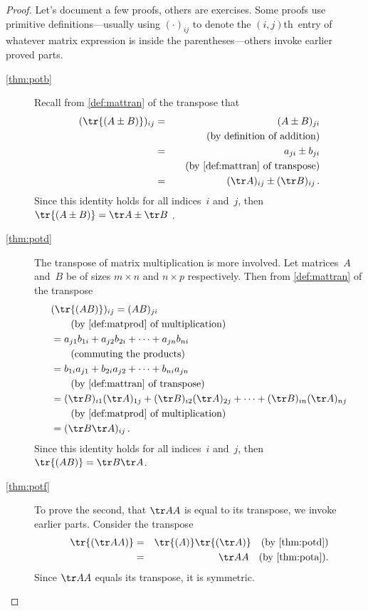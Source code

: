\begin{proof} 
Let's document a few proofs, others are exercises.
Some proofs use primitive definitions---usually using \((\cdot)_{ij}\) to denote the \((i,j)\)th~entry of whatever matrix expression is inside the parentheses---others invoke earlier proved parts.
\begin{description}
\item[\ref{thm:potb}]
Recall from \autoref{def:mattran} of the transpose that
\begin{eqnarray*}
(\tr{(A\pm B)})_{ij}
&=&(A\pm B)_{ji}
\\&&\quad(\text{by definition of addition})
\\&=&a_{ji}\pm b_{ji}
\\&&\quad(\text{by \autoref{def:mattran} of transpose})
\\&=&(\tr A)_{ij}\pm(\tr B)_{ij}\,.
\end{eqnarray*}
Since this identity holds for all indices~\(i\) and~\(j\), then \(\tr{(A\pm B)}=\tr A\pm \tr B\) .

\item[\ref{thm:potd}]
The transpose of matrix multiplication is more involved.
Let matrices~\(A\) and~\(B\) be of sizes \(m\times n\) and \(n\times p\) respectively.  Then from \autoref{def:mattran} of the transpose
\begin{align*}
&(\tr{(AB)})_{ij}=(AB)_{ji}
\\&\qquad(\text{by \autoref{def:matprod} of multiplication})
\\&=a_{j1}b_{1i}+a_{j2}b_{2i}+\cdots+a_{jn}b_{ni}
\\&\qquad(\text{commuting the products})
\\&=b_{1i}a_{j1}+b_{2i}a_{j2}+\cdots+b_{ni}a_{jn}
\\&\qquad(\text{by \autoref{def:mattran} of  transpose})
\\&=(\tr B)_{i1}(\tr A)_{1j}+(\tr B)_{i2}(\tr A)_{2j}+\cdots+(\tr B)_{in}(\tr A)_{nj}
\\&\qquad(\text{by \autoref{def:matprod} of multiplication})
\\&=(\tr B\tr A)_{ij}\,.
\end{align*}
Since this identity holds for all indices~\(i\) and~\(j\), then \(\tr{(AB)}=\tr B\tr A\).

\item[\ref{thm:potf}] To prove the second, that \(\tr AA\) is equal to its transpose, we invoke earlier parts.
Consider the transpose 
\begin{eqnarray*}
\tr{(\tr AA)}&=& \tr{(A)}\tr{(\tr A)}\quad(\text{by~\autoref{thm:potd}})
\\&=&\tr AA\quad(\text{by~\autoref{thm:pota}}).
\end{eqnarray*}
Since \(\tr AA\) equals its transpose, it is symmetric.
\end{description}
\end{proof}








